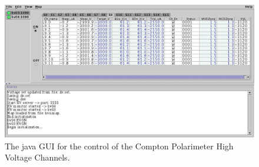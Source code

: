  \begin{figure}[htp]
    \begin{center}
        \includegraphics*[angle=0,scale=0.45]{compton_hv}
    \end{center}
    \caption[compton:electron hv]{
            The java GUI for  the control of the Compton Polarimeter High Voltage  Channels.}
    \label{fig:compton_hv}
 \end{figure}

